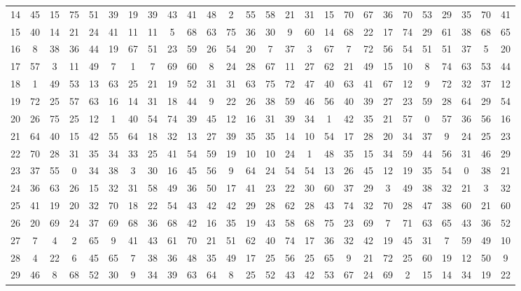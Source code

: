 \begin{table}
\begin{tabular}{c c c c c c c c c c c c c c c c c c c c c c c c c c }
14 & 45 & 15 & 75 & 51 & 39 & 19 & 39 & 43 & 41 & 48 & 2 & 55 & 58 & 21 & 31 & 15 & 70 & 67 & 36 & 70 & 53 & 29 & 35 & 70 & 41 \\
15 & 40 & 14 & 21 & 24 & 41 & 11 & 11 & 5 & 68 & 63 & 75 & 36 & 30 & 9 & 60 & 14 & 68 & 22 & 17 & 74 & 29 & 61 & 38 & 68 & 65 \\
16 & 8 & 38 & 36 & 44 & 19 & 67 & 51 & 23 & 59 & 26 & 54 & 20 & 7 & 37 & 3 & 67 & 7 & 72 & 56 & 54 & 51 & 51 & 37 & 5 & 20 \\
17 & 57 & 3 & 11 & 49 & 7 & 1 & 7 & 69 & 60 & 8 & 24 & 28 & 67 & 11 & 27 & 62 & 21 & 49 & 15 & 10 & 8 & 74 & 63 & 53 & 44 \\
18 & 1 & 49 & 53 & 13 & 63 & 25 & 21 & 19 & 52 & 31 & 31 & 63 & 75 & 72 & 47 & 40 & 63 & 41 & 67 & 12 & 9 & 72 & 32 & 37 & 12 \\
19 & 72 & 25 & 57 & 63 & 16 & 14 & 31 & 18 & 44 & 9 & 22 & 26 & 38 & 59 & 46 & 56 & 40 & 39 & 27 & 23 & 59 & 28 & 64 & 29 & 54 \\
20 & 26 & 75 & 25 & 12 & 1 & 40 & 54 & 74 & 39 & 45 & 12 & 16 & 31 & 39 & 34 & 1 & 42 & 35 & 21 & 57 & 0 & 57 & 36 & 56 & 16 \\
21 & 64 & 40 & 15 & 42 & 55 & 64 & 18 & 32 & 13 & 27 & 39 & 35 & 35 & 14 & 10 & 54 & 17 & 28 & 20 & 34 & 37 & 9 & 24 & 25 & 23 \\
22 & 70 & 28 & 31 & 35 & 34 & 33 & 25 & 41 & 54 & 59 & 19 & 10 & 10 & 24 & 1 & 48 & 35 & 15 & 34 & 59 & 44 & 56 & 31 & 46 & 29 \\
23 & 37 & 55 & 0 & 34 & 38 & 3 & 30 & 16 & 45 & 56 & 9 & 64 & 24 & 54 & 54 & 13 & 26 & 45 & 12 & 19 & 35 & 54 & 0 & 38 & 21 \\
24 & 36 & 63 & 26 & 15 & 32 & 31 & 58 & 49 & 36 & 50 & 17 & 41 & 23 & 22 & 30 & 60 & 37 & 29 & 3 & 49 & 38 & 32 & 21 & 3 & 32 \\
25 & 41 & 19 & 20 & 32 & 70 & 18 & 22 & 54 & 43 & 42 & 42 & 29 & 28 & 62 & 28 & 43 & 74 & 32 & 70 & 28 & 47 & 38 & 60 & 21 & 60 \\
26 & 20 & 69 & 24 & 37 & 69 & 68 & 36 & 68 & 42 & 16 & 35 & 19 & 43 & 58 & 68 & 75 & 23 & 69 & 7 & 71 & 63 & 65 & 43 & 36 & 52 \\
27 & 7 & 4 & 2 & 65 & 9 & 41 & 43 & 61 & 70 & 21 & 51 & 62 & 40 & 74 & 17 & 36 & 32 & 42 & 19 & 45 & 31 & 7 & 59 & 49 & 10 \\
28 & 4 & 22 & 6 & 45 & 65 & 7 & 38 & 36 & 48 & 35 & 49 & 17 & 25 & 56 & 25 & 65 & 9 & 21 & 72 & 25 & 60 & 19 & 12 & 50 & 9 \\
29 & 46 & 8 & 68 & 52 & 30 & 9 & 34 & 39 & 63 & 64 & 8 & 25 & 52 & 43 & 42 & 53 & 67 & 24 & 69 & 2 & 15 & 14 & 34 & 19 & 22 \\

\end{tabular}
\end{table}
